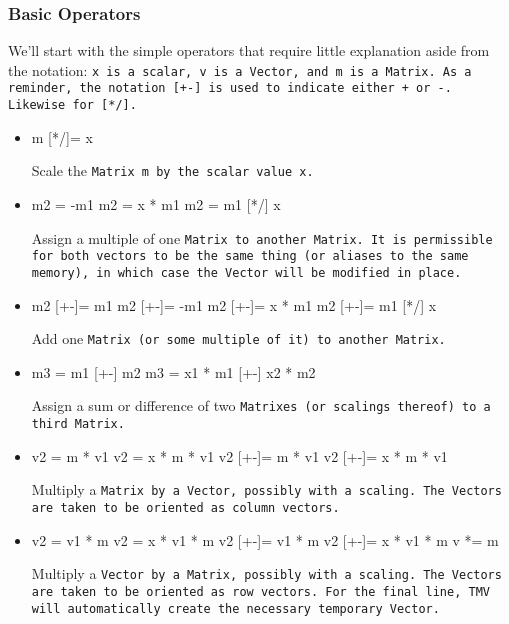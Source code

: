 \subsubsection{Basic Operators}

We'll start with the simple operators that require little explanation aside from the 
notation: 
\tt{x} is a scalar, \tt{v} is a \tt{Vector}, and \tt{m} is a \tt{Matrix}.  As a reminder,
the notation \tt{[+-]} is used to indicate either \tt{+} or \tt{-}.  Likewise for \tt{[*/]}.

\begin{itemize}

\item
\begin{tmvcode}
m [*/]= x
\end{tmvcode}
Scale the \tt{Matrix m} by the scalar value \tt{x}.

\item
\begin{tmvcode}
m2 = -m1
m2 = x * m1
m2 = m1 [*/] x
\end{tmvcode}
Assign a multiple of one \tt{Matrix} to another \tt{Matrix}.  It is permissible for both vectors to be the same thing (or aliases to the same memory), in which case the \tt{Vector} will be modified in place.

\item
\begin{tmvcode}
m2 [+-]= m1
m2 [+-]= -m1
m2 [+-]= x * m1
m2 [+-]= m1 [*/] x
\end{tmvcode}
Add one \tt{Matrix} (or some multiple of it) to another \tt{Matrix}.

\item
\begin{tmvcode}
m3 = m1 [+-] m2
m3 = x1 * m1 [+-] x2 * m2
\end{tmvcode}
Assign a sum or difference of two \tt{Matrix}es (or scalings thereof) to a third \tt{Matrix}.

\item
\begin{tmvcode}
v2 = m * v1
v2 = x * m * v1
v2 [+-]= m * v1
v2 [+-]= x * m * v1
\end{tmvcode}
Multiply a \tt{Matrix} by a \tt{Vector}, possibly with a scaling.  The \tt{Vectors} are taken to be oriented as column vectors.

\item
\begin{tmvcode}
v2 = v1 * m
v2 = x * v1 * m
v2 [+-]= v1 * m
v2 [+-]= x * v1 * m
v *= m
\end{tmvcode}
Multiply a \tt{Vector} by a \tt{Matrix}, possibly with a scaling.  The \tt{Vectors} are taken to be oriented as row vectors.  For the final line, TMV will automatically create the necessary temporary \tt{Vector}.


\end{itemize}
